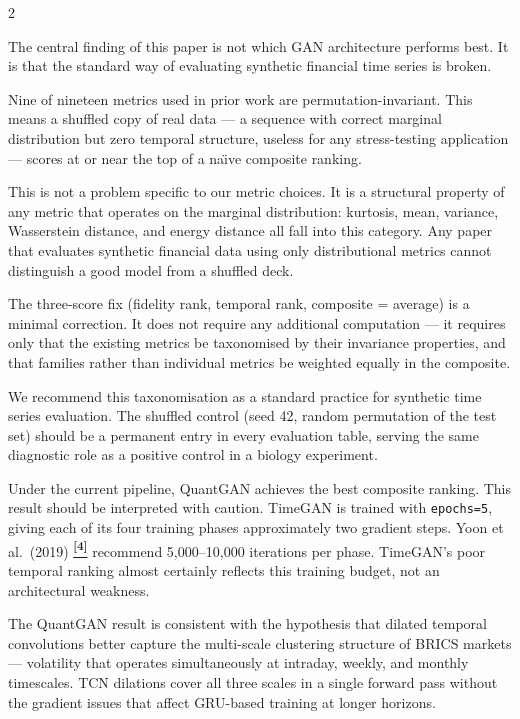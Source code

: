 \documentclass[10pt]{article}
\newcommand{\navybox}[2]{\begin{tcolorbox}[mybox={Navy}{LBg},title={#1}]#2\end{tcolorbox}}
\newcommand{\skybox}[2]{\begin{tcolorbox}[mybox={Sky}{BBg},title={#1}]#2\end{tcolorbox}}
\newcommand{\tcite}[1]{%
  \hyperlink{R:#1}{\textsuperscript{\scriptsize\textbf{[#1]}}}}
\begin{document}
\begin{multicols}{2}

\navybox{The Shuffled-Control Audit as a Methodological Contribution}{%
The central finding of this paper is not which GAN architecture performs best. It is that the standard way of evaluating synthetic financial time series is broken.

Nine of nineteen metrics used in prior work are permutation-invariant. This means a shuffled copy of real data --- a sequence with correct marginal distribution but zero temporal structure, useless for any stress-testing application --- scores at or near the top of a na\"{\i}ve composite ranking.

This is not a problem specific to our metric choices. It is a structural property of any metric that operates on the marginal distribution: kurtosis, mean, variance, Wasserstein distance, and energy distance all fall into this category. Any paper that evaluates synthetic financial data using only distributional metrics cannot distinguish a good model from a shuffled deck.

The three-score fix (fidelity rank, temporal rank, composite = average) is a minimal correction. It does not require any additional computation --- it requires only that the existing metrics be taxonomised by their invariance properties, and that families rather than individual metrics be weighted equally in the composite.

We recommend this taxonomisation as a standard practice for synthetic time series evaluation. The shuffled control (seed 42, random permutation of the test set) should be a permanent entry in every evaluation table, serving the same diagnostic role as a positive control in a biology experiment.}

\skybox{Architecture Comparison and the TimeGAN Caveat}{%
Under the current pipeline, QuantGAN achieves the best composite ranking. This result should be interpreted with caution. TimeGAN is trained with \texttt{epochs=5}, giving each of its four training phases approximately two gradient steps. Yoon et al.\ (2019)\tcite{4} recommend 5{,}000--10{,}000 iterations per phase. TimeGAN's poor temporal ranking almost certainly reflects this training budget, not an architectural weakness.

The QuantGAN result is consistent with the hypothesis that dilated temporal convolutions better capture the multi-scale clustering structure of BRICS markets --- volatility that operates simultaneously at intraday, weekly, and monthly timescales. TCN dilations cover all three scales in a single forward pass without the gradient issues that affect GRU-based training at longer horizons.

}
\end{multicols}
\end{document}
